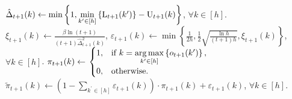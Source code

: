 \documentclass{article}
\begin{document}
\begin{algorithm}[h]
\begin{algorithmic}
		\STATE $\hat{\Delta}_{t+1}(k) \gets \min\left\{ 1,  \min\limits_{k^\prime \in \left[h\right]}\left\{ {\text{L}}_{t+1}(k^\prime) \right\}  - {\text{U}}_{t+1}(k)\right\} $, $\forall k \in [h]$.
		\STATE $\xi_{t+1}(k) \gets \frac{\beta \ln{(t+1)}}{(t+1) \hat{\Delta}_{t+1}^2(k)}$, $\varepsilon_{t+1}(k) \gets \min\left\{ \frac{1}{2 h}, \frac{1}{2} \sqrt{\frac{\ln{h}}{(t+1) h}},  \xi_{t+1}(k) \right\}$, $\forall k \in [h]$.
		\STATE $\pi_{t+1}(k) \gets \left. 
		    \begin{cases}
		    1, & \text{if } k = \operatorname*{arg\,max}\limits_{k^\prime \in \left[h\right]}\left\{ o_{t+1}(k^\prime)\right\}, \\
		    0, & \text{otherwise}.
		    \end{cases}
		    \right.$
		\STATE $\tilde{\pi}_{t+1}(k) \gets \left( 1 - \sum\limits_{k^\prime \in [h]}{\varepsilon_{t+1}(k)} \right) \cdot  \pi_{t+1}(k) + \varepsilon_{t+1}(k)$, $\forall k \in [h]$.
		
		\ENDFOR
	\end{algorithmic}
\end{algorithm}
\end{document}
